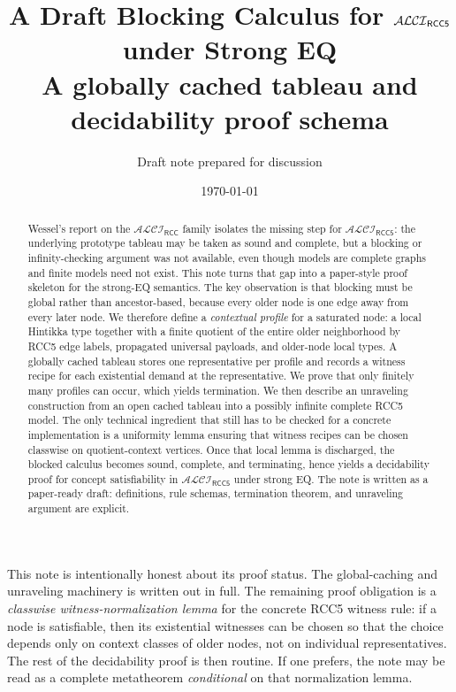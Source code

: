 \documentclass[11pt]{article}
\title{A Draft Blocking Calculus for \texorpdfstring{$\ALCIRCCFive$}{ALCI RCC5} under Strong EQ\\[0.4em]
\large A globally cached tableau and decidability proof schema}
\author{Draft note prepared for discussion}
\date{\today}
\theoremstyle{definition}
\newcommand{\ALCIRCC}{\mathcal{ALCI}_{\mathsf{RCC}}}
\newcommand{\ALCIRCCFive}{\mathcal{ALCI}_{\mathsf{RCC5}}}
\begin{document}
\maketitle

\begin{abstract}
Wessel's report on the $\ALCIRCC$ family isolates the missing step for $\ALCIRCCFive$: the underlying prototype tableau may be taken as sound and complete, but a blocking or infinity-checking argument was not available, even though models are complete graphs and finite models need not exist. This note turns that gap into a paper-style proof skeleton for the strong-EQ semantics. The key observation is that blocking must be global rather than ancestor-based, because every older node is one edge away from every later node. We therefore define a \emph{contextual profile} for a saturated node: a local Hintikka type together with a finite quotient of the entire older neighborhood by RCC5 edge labels, propagated universal payloads, and older-node local types. A globally cached tableau stores one representative per profile and records a witness recipe for each existential demand at the representative. We prove that only finitely many profiles can occur, which yields termination. We then describe an unraveling construction from an open cached tableau into a possibly infinite complete RCC5 model. The only technical ingredient that still has to be checked for a concrete implementation is a uniformity lemma ensuring that witness recipes can be chosen classwise on quotient-context vertices. Once that local lemma is discharged, the blocked calculus becomes sound, complete, and terminating, hence yields a decidability proof for concept satisfiability in $\ALCIRCCFive$ under strong EQ. The note is written as a paper-ready draft: definitions, rule schemas, termination theorem, and unraveling argument are explicit.
\end{abstract}

\begin{tcolorbox}[colback=blue!3,colframe=blue!35!black,title=Status of the result]
This note is intentionally honest about its proof status. The global-caching and unraveling machinery is written out in full. The remaining proof obligation is a \emph{classwise witness-normalization lemma} for the concrete RCC5 witness rule: if a node is satisfiable, then its existential witnesses can be chosen so that the choice depends only on context classes of older nodes, not on individual representatives. The rest of the decidability proof is then routine. If one prefers, the note may be read as a complete metatheorem \emph{conditional} on that normalization lemma.
\end{tcolorbox}
\end{document}
